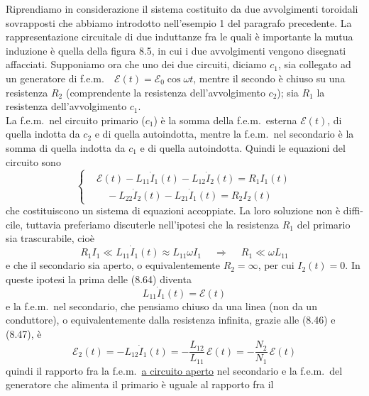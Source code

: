 Riprendiamo in considerazione il sistema costituito da due avvolgimenti
toroidali sovrapposti che abbiamo introdotto nell'esempio 1 del paragrafo
precedente. La rappresentazione circuitale di due induttanze fra le quali \`e
importante la mutua induzione \`e quella della figura 8.5, in cui i due
avvolgimenti vengono disegnati affacciati.
Supponiamo ora che uno dei due circuiti, diciamo $c_1$, sia collegato ad un
generatore di f.e.m.\ \ $\mathcal E(t)=\mathcal E_0\cos\omega t$, mentre il
secondo \`e chiuso su una resistenza $R_2$ (comprendente la resistenza
dell'avvolgimento $c_2$); sia $R_1$ la resistenza dell'avvolgimento $c_1$.\\
La f.e.m.\ nel circuito primario ($c_1$) \`e la somma della f.e.m.\ esterna
$\mathcal E(t)$, di quella indotta da $c_2$ e di quella autoindotta, mentre la
f.e.m.\ nel secondario \`e la somma di quella indotta da $c_1$ e di quella
autoindotta. Quindi le equazioni del circuito sono
\begin{equation}
  \left\{\begin{aligned}
    &\mathcal E(t)-L_{11}\dot I_1(t)-L_{12}\dot I_2(t)=R_1I_1(t)\\
    &\quad-L_{22}\dot I_2(t)-L_{21}\dot I_1(t)=R_2I_2(t)
  \end{aligned}\right.
  \tag{8.64}
\end{equation}
che costituiscono un sistema di equazioni accoppiate. La loro soluzione non \`e
diffi-
cile, tuttavia preferiamo discuterle nell'ipotesi che la resistenza $R_1$ del
primario sia trascurabile, cio\`e
\begin{equation}
  R_1I_1\ll L_{11}\dot I_1(t)\approx L_{11}\omega I_1
  \quad\ \Rightarrow\quad\ R_1\ll\omega L_{11}
  \tag{8.65}
\end{equation}
e che il secondario sia aperto, o equivalentemente $R_2=\infty$, per cui
$I_2(t)=0$. In queste ipotesi la prima delle (8.64) diventa
\begin{equation}
  L_{11}\dot I_1(t)=\mathcal E(t)
  \tag{8.66}
\end{equation}
e la f.e.m.\ nel secondario, che pensiamo chiuso da una linea (non da un
conduttore), o equivalentemente dalla resistenza infinita, grazie alle (8.46) e
(8.47), \`e
\begin{equation}
  \mathcal E_2(t)=-L_{12}\dot I_1(t)=-\frac{L_{12}}{L_{11}}\,\mathcal E(t)
  =-\frac{N_2}{N_1}\,\mathcal E(t)
  \tag{8.67}
\end{equation}
quindi il rapporto fra la f.e.m.\ \underline{a circuito aperto} nel secondario e
la f.e.m.\ del generatore che alimenta il primario \`e uguale al rapporto fra il
